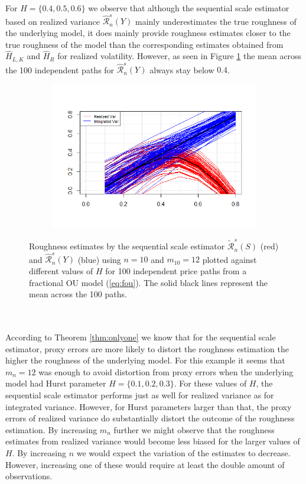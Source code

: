 \documentclass{article}
\begin{document}
For $H=\{0.4,0.5,0.6\}$ we observe that although the sequential scale estimator based on realized variance $\widehat{\mathscr{R}}_n^s (Y)$ mainly underestimates the true roughness of the underlying model, it does mainly provide roughness estimates closer to the true roughness of the model than the corresponding estimates obtained from $\widehat{H}_{L,K}$ and $\widehat{H}_{R}$ for realized volatility. However, as seen in Figure \ref{fig:ex7multiple_scale} the mean across the 100 independent paths for $\widehat{\mathscr{R}}_n^s (Y)$ always stay below $0.4$.
\begin{figure}[htbp]
    \centering
    
    \begin{subfigure}{0.78\textwidth}
        \includegraphics[width=\linewidth]{ex7_scale_multiple.png}
    \end{subfigure}
    
    \caption{Roughness estimates by the sequential scale estimator $\widetilde{\mathscr{R}}_n^s (S)$ (red) and $\widehat{\mathscr{R}}_n^s (Y)$ (blue) using $n=10$ and $m_{10}=12$ plotted against different values of $H$ for 100 independent price paths from a fractional OU model (\ref{eq:fou}). The solid black lines represent the mean across the 100 paths.}
    \label{fig:ex7multiple_scale}
\end{figure}\\\\
According to Theorem \ref{thm:onlyone} we know that for the sequential scale estimator, proxy errors are more likely to distort the roughness estimation the higher the roughness of the underlying model. For this example it seems that $m_n=12$ was enough to avoid distortion from proxy errors when the underlying model had Hurst parameter $H=\{0.1,0.2,0.3\}$. For these values of $H$, the sequential scale estimator performs just as well for realized variance as for integrated variance. However, for Hurst parameters larger than that, the proxy errors of realized variance do substantially distort the outcome of the roughness estimation. By increasing $m_n$ further we might observe that the roughness estimates from realized variance would become less biased for the larger values of $H$. By increasing $n$ we would expect the variation of the estimates to decrease. However, increasing one of these would require at least the double amount of observations.\\\\
\end{document}
